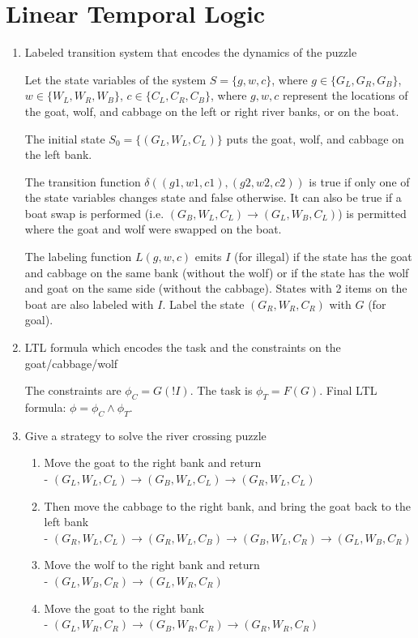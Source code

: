 \section{Linear Temporal Logic}
\begin{enumerate}[label=(\alph*)]
  \item {\color{blue}Labeled transition system that encodes the dynamics of the puzzle}

    Let the state variables of the system $S = \{g, w, c\}$, where $g \in \{G_L, G_R, G_B\}$, $w \in \{W_L, W_R, W_B\}$, $c \in \{C_L, C_R, C_B\}$, where $g, w, c$ represent the locations of the goat, wolf, and cabbage on the left or right river banks, or on the boat.

    The initial state $S_0 = \{(G_L, W_L, C_L)\}$ puts the goat, wolf, and cabbage on the left bank.

    The transition function $\delta((g1,w1,c1), (g2,w2,c2))$ is true if only one of the state variables changes state and false otherwise. It can also be true if a boat swap is performed (i.e. $(G_B, W_L, C_L) \rightarrow (G_L, W_B, C_L)$) is permitted where the goat and wolf were swapped on the boat.

    The labeling function $L(g, w, c)$ emits $I$ (for illegal) if the state has the goat and cabbage on the same bank (without the wolf) or if the state has the wolf and goat on the same side (without the cabbage). States with 2 items on the boat are also labeled with $I$. Label the state $(G_R, W_R, C_R)$ with $G$ (for goal).

  \item {\color{blue}LTL formula which encodes the task and the constraints on the goat/cabbage/wolf}

    The constraints are $\phi_C = G(!I)$. The task is $\phi_T = F(G)$. Final LTL formula: $\phi = \phi_C \land \phi_T$.

  \item {\color{blue}Give a strategy to solve the river crossing puzzle}

    \begin{enumerate}
      \item Move the goat to the right bank and return \\
        - $(G_L, W_L, C_L) \rightarrow (G_B, W_L, C_L) \rightarrow (G_R, W_L, C_L)$
      \item Then move the cabbage to the right bank, and bring the goat back to the left bank \\
        - $(G_R, W_L, C_L) \rightarrow (G_R, W_L, C_B) \rightarrow (G_B, W_L, C_R) \rightarrow (G_L, W_B, C_R)$
      \item Move the wolf to the right bank and return \\
        - $(G_L, W_B, C_R) \rightarrow (G_L, W_R, C_R)$
      \item Move the goat to the right bank \\
        - $(G_L, W_R, C_R) \rightarrow (G_B, W_R, C_R) \rightarrow (G_R, W_R, C_R)$
    \end{enumerate}


\end{enumerate}
